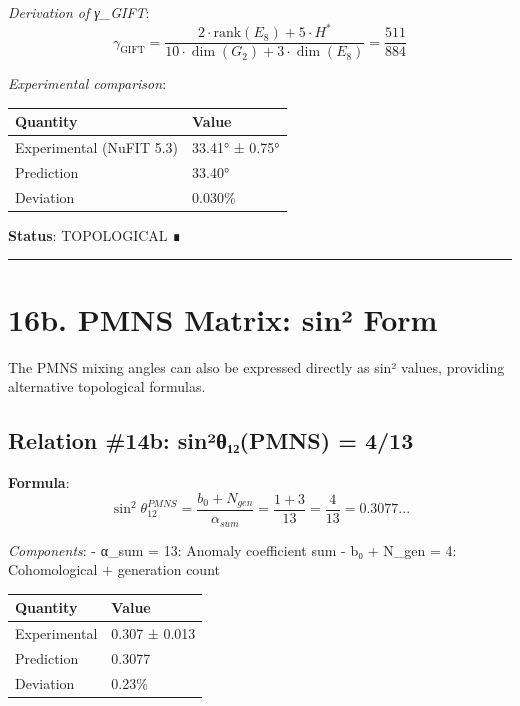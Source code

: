 \documentclass[11pt,a4paper]{article}
\begin{document}
\emph{Derivation of γ\_\allowbreak{}GIFT}: \[\gamma_{\text{GIFT}} = \frac{2 \cdot \text{rank}(E_8) + 5 \cdot H^*}{10 \cdot \dim(G_2) + 3 \cdot \dim(E_8)} = \frac{511}{884}\]

\emph{Experimental comparison}:

\begin{longtable}[]{@{}ll@{}}
\toprule\noalign{}
Quantity & Value \\
\midrule\noalign{}
\endhead
\bottomrule\noalign{}
\endlastfoot
Experimental (NuFIT 5.3) & 33.41° ± 0.75° \\
Prediction & 33.40° \\
Deviation & 0.030\% \\
\end{longtable}

\textbf{Status}: TOPOLOGICAL ∎

\begin{center}\rule{\linewidth}{0.5pt}\end{center}

\section{16b. PMNS Matrix: sin² Form}\label{b.-pmns-matrix-sinuxb2-form}

The PMNS mixing angles can also be expressed directly as sin² values, providing alternative topological formulas.

\subsection{Relation \#14b: sin²θ₁₂(PMNS) = 4/13}\label{relation-14b-sinuxb2ux3b8ux2081ux2082pmns-413}

\textbf{Formula}: \[\sin^2\theta_{12}^{PMNS} = \frac{b_0 + N_{gen}}{\alpha_{sum}} = \frac{1 + 3}{13} = \frac{4}{13} = 0.3077...\]

\emph{Components}: - α\_\allowbreak{}sum = 13: Anomaly coefficient sum - b₀ + N\_\allowbreak{}gen = 4: Cohomological + generation count

\begin{longtable}[]{@{}ll@{}}
\toprule\noalign{}
Quantity & Value \\
\midrule\noalign{}
\endhead
\bottomrule\noalign{}
\endlastfoot
Experimental & 0.307 ± 0.013 \\
Prediction & 0.3077 \\
Deviation & 0.23\% \\
\end{longtable}
\end{document}
